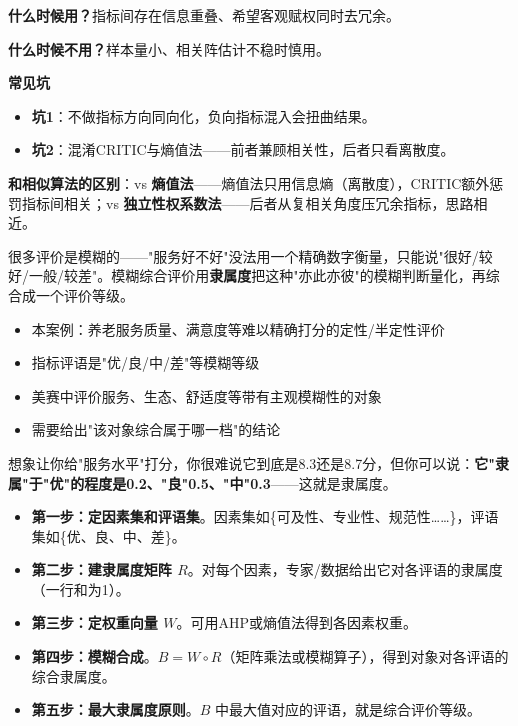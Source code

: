 \begin{algonotes}
\textbf{什么时候用？}指标间存在信息重叠、希望客观赋权同时去冗余。

\textbf{什么时候不用？}样本量小、相关阵估计不稳时慎用。

\textbf{常见坑}
\begin{itemize}
    \item \textbf{坑1}：不做指标方向同向化，负向指标混入会扭曲结果。
    \item \textbf{坑2}：混淆CRITIC与熵值法——前者兼顾相关性，后者只看离散度。
\end{itemize}

\textbf{和相似算法的区别}：vs \textbf{熵值法}——熵值法只用信息熵（离散度），CRITIC额外惩罚指标间相关；vs \textbf{独立性权系数法}——后者从复相关角度压冗余指标，思路相近。
\end{algonotes}


\begin{algointro}
很多评价是模糊的——"服务好不好"没法用一个精确数字衡量，只能说"很好/较好/一般/较差"。模糊综合评价用\textbf{隶属度}把这种"亦此亦彼"的模糊判断量化，再综合成一个评价等级。
\end{algointro}

\begin{algoscene}
\begin{itemize}
    \item 本案例：养老服务质量、满意度等难以精确打分的定性/半定性评价
    \item 指标评语是"优/良/中/差"等模糊等级
    \item 美赛中评价服务、生态、舒适度等带有主观模糊性的对象
    \item 需要给出"该对象综合属于哪一档"的结论
\end{itemize}
\end{algoscene}

\begin{algoprinciple}
想象让你给"服务水平"打分，你很难说它到底是8.3还是8.7分，但你可以说：\textbf{它"隶属"于"优"的程度是0.2、"良"0.5、"中"0.3}——这就是隶属度。

\begin{itemize}
    \item \textbf{第一步：定因素集和评语集}。因素集如\{可及性、专业性、规范性……\}，评语集如\{优、良、中、差\}。
    \item \textbf{第二步：建隶属度矩阵 $R$}。对每个因素，专家/数据给出它对各评语的隶属度（一行和为1）。
    \item \textbf{第三步：定权重向量 $W$}。可用AHP或熵值法得到各因素权重。
    \item \textbf{第四步：模糊合成}。$B=W\circ R$（矩阵乘法或模糊算子），得到对象对各评语的综合隶属度。
    \item \textbf{第五步：最大隶属度原则}。$B$ 中最大值对应的评语，就是综合评价等级。
\end{itemize}
\end{algoprinciple}

